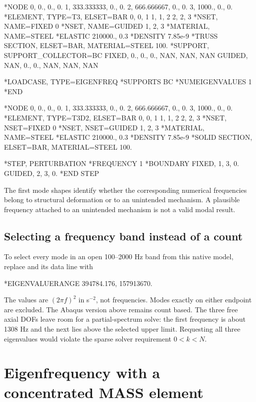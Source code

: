 \begin{dialectexamples}
\begin{femasterdeck}
*NODE
0,    0., 0., 0.
1,  333.333333, 0., 0.
2,  666.666667, 0., 0.
3, 1000., 0., 0.
*ELEMENT, TYPE=T3, ELSET=BAR
0, 0, 1
1, 1, 2
2, 2, 3
*NSET, NAME=FIXED
0
*NSET, NAME=GUIDED
1, 2, 3
*MATERIAL, NAME=STEEL
*ELASTIC
210000., 0.3
*DENSITY
7.85e-9
*TRUSS SECTION, ELSET=BAR, MATERIAL=STEEL
100.
*SUPPORT, SUPPORT_COLLECTOR=BC
FIXED, 0., 0., 0., NAN, NAN, NAN
GUIDED, NAN, 0., 0., NAN, NAN, NAN

*LOADCASE, TYPE=EIGENFREQ
*SUPPORTS
BC
*NUMEIGENVALUES
1
*END
\end{femasterdeck}
\begin{abaqusdeck}
*NODE
0,    0., 0., 0.
1,  333.333333, 0., 0.
2,  666.666667, 0., 0.
3, 1000., 0., 0.
*ELEMENT, TYPE=T3D2, ELSET=BAR
0, 0, 1
1, 1, 2
2, 2, 3
*NSET, NSET=FIXED
0
*NSET, NSET=GUIDED
1, 2, 3
*MATERIAL, NAME=STEEL
*ELASTIC
210000., 0.3
*DENSITY
7.85e-9
*SOLID SECTION, ELSET=BAR, MATERIAL=STEEL
100.

*STEP, PERTURBATION
*FREQUENCY
1
*BOUNDARY
FIXED, 1, 3, 0.
GUIDED, 2, 3, 0.
*END STEP
\end{abaqusdeck}
\end{dialectexamples}

The first mode shapes identify whether the corresponding numerical frequencies belong to structural deformation or to an unintended mechanism. A plausible frequency attached to an unintended mechanism is not a valid modal result.


\subsection*{Selecting a frequency band instead of a count}

To select every mode in an open 100--2000 Hz band from this native model, replace  and its data line with
\begin{syntax}
*EIGENVALUERANGE
394784.176, 157913670.
\end{syntax}
The values are \((2\pi f)^2\) in s\(^{-2}\), not frequencies. Modes exactly on either endpoint are excluded. The Abaqus version above remains count based. The three free axial DOFs leave room for a partial-spectrum solve: the first frequency is about 1308 Hz and the next lies above the selected upper limit. Requesting all three eigenvalues would violate the sparse solver requirement \(0<k<N\).

\section{Eigenfrequency with a concentrated MASS element}

